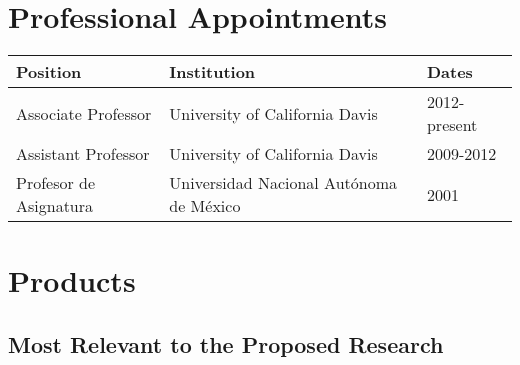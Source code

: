 \documentclass[10pt]{article}
\begin{document}
\section{Professional Appointments}

\begin{tabular}{l l l}
Position & Institution                 & Dates\\
\hline
Associate Professor & University of California Davis &		2012-present \\
Assistant Professor & University of California Davis &		2009-2012 \\
Profesor de Asignatura & Universidad Nacional Aut\'{o}noma de M\'{e}xico & 2001 \\
\end{tabular}

\section{Products}

\subsection*{Most Relevant to the Proposed Research}
\end{document}
